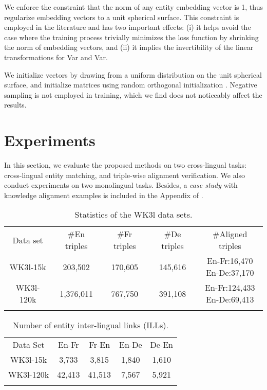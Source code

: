\documentclass{article}
\def\inv{\vspace{-0.1cm}}
\begin{document}
	




We enforce the constraint that the  norm of any entity embedding vector is 1,
thus regularize embedding vectors to a unit spherical surface.
This constraint is employed in the literature
\cite{bordes2013translating,bordes2014open,jenatton2012latent} and has two important effects:
(i) it helps avoid the case where the training process trivially minimizes the loss function by shrinking the norm of embedding vectors, and
(ii) it implies the invertibility of the linear transformations \cite{xing2015normalized} for Var and Var.


We initialize vectors by drawing from a uniform distribution on the unit spherical surface,
and initialize matrices using random orthogonal initialization \cite{saxe2013exact}.
Negative sampling is not employed in training, which we find does not noticeably affect the \mbox{results}.
\def\hits{\mathit{Hits}\mbox{@}10}
\def\mean{\mathit{Mean}}

\inv
\section{Experiments}

In this section, we evaluate the proposed methods on two cross-lingual tasks: cross-lingual entity matching, and triple-wise alignment verification.
We also conduct experiments on two monolingual tasks. Besides, a \emph{case study} with knowledge alignment examples is included in the Appendix of \cite{chen2016arxiv}.

\begin{table}[t]
\centering
\caption{Statistics of the WK3l data sets.}
\label{tbl:statistics}
\vspace{-1em}
\scriptsize
\begin{tabular}{c|cccc}
\bhline
Data set&\#En triples&\#Fr triples&\#De triples&\#Aligned triples\\
\bhline
WK3l-15k&203,502&170,605&145,616&\makecell{En-Fr:16,470\\En-De:37,170}\\
\hline
WK3l-120k&1,376,011&767,750&391,108&\makecell{En-Fr:124,433\\En-De:69,413}\\
\bhline
\end{tabular}
\vspace{-1em}
\end{table}

\begin{table}[t]
\centering
\caption{Number of entity inter-lingual links (ILLs).}
\label{tbl:ills}
\vspace{-1em}
\scriptsize
\begin{tabular}{c|cccc}
\bhline
Data Set&En-Fr&Fr-En&En-De&De-En\\
\bhline
WK3l-15k&3,733&3,815&1,840&1,610\\
\hline
WK3l-120k&42,413&41,513&7,567&5,921\\
\bhline
\end{tabular}
\vspace{-1.5em}
\end{table}
\end{document}
